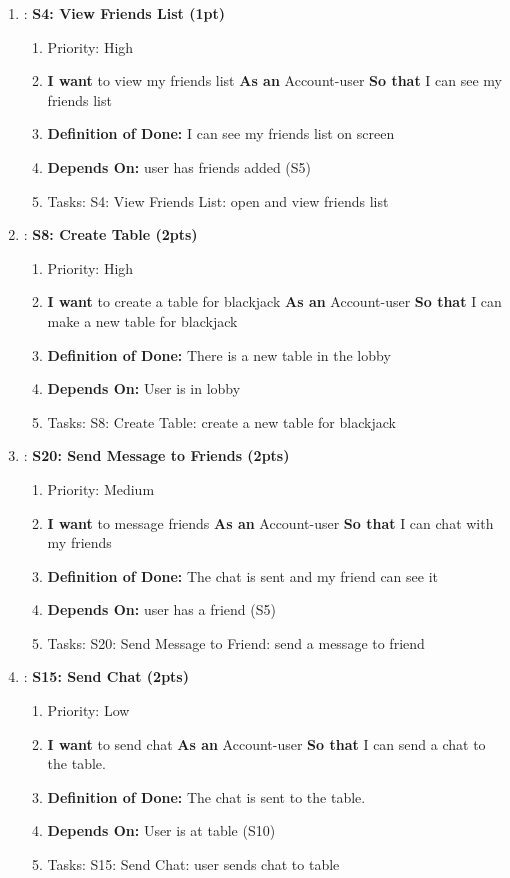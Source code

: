 \begin{enumerate}
    \item: \textbf{S4: View Friends List (1pt)}
    \begin{enumerate}
        \item Priority: High 
        \item \textbf{I want} to view my friends list \textbf{As an} Account-user \textbf{So that} I can see my friends list
        \item \textbf{Definition of Done:} I can see my friends list on screen
        \item \textbf{Depends On:} user has friends added (S5)
        \item Tasks: S4: View Friends List: open and view friends list
    \end{enumerate}

    \item: \textbf{S8: Create Table (2pts)}
    \begin{enumerate}
        \item Priority: High 
        \item \textbf{I want} to create a table for blackjack \textbf{As an} Account-user \textbf{So that} I can make a new table for blackjack
        \item \textbf{Definition of Done:} There is a new table in the lobby
        \item \textbf{Depends On:} User is in lobby
        \item Tasks: S8: Create Table: create a new table for blackjack
    \end{enumerate}

    \item: \textbf{S20: Send Message to Friends (2pts)}
    \begin{enumerate}
        \item Priority: Medium
        \item \textbf{I want} to message friends \textbf{As an} Account-user \textbf{So that} I can chat with my friends
        \item \textbf{Definition of Done:} The chat is sent and my friend can see it
        \item \textbf{Depends On:} user has a friend (S5)
        \item Tasks: S20: Send Message to Friend: send a message to friend
    \end{enumerate}

    \item: \textbf{S15: Send Chat (2pts)}
    \begin{enumerate}
        \item Priority: Low
        \item \textbf{I want} to send chat \textbf{As an} Account-user \textbf{So that} I can send a chat to the table.
        \item \textbf{Definition of Done:} The chat is sent to the table.
        \item \textbf{Depends On:} User is at table (S10)
        \item Tasks: S15: Send Chat: user sends chat to table
    \end{enumerate}


\end{enumerate}
